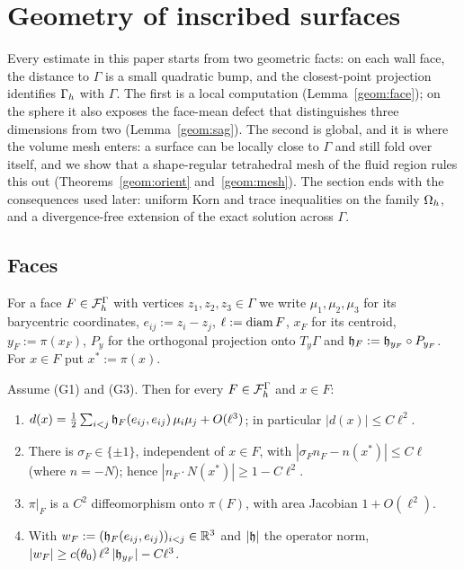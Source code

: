 \section{Geometry of inscribed surfaces}\label{sec:geometry}

Every estimate in this paper starts from two geometric facts: on each wall face, the distance to $\Gamma$ is a small quadratic bump, and the closest-point projection identifies $\Gamma_h$ with $\Gamma$. The first is a local computation (Lemma~\ref{geom:face}); on the sphere it also exposes the face-mean defect that distinguishes three dimensions from two (Lemma~\ref{geom:sag}). The second is global, and it is where the volume mesh enters: a surface can be locally close to $\Gamma$ and still fold over itself, and we show that a shape-regular tetrahedral mesh of the fluid region rules this out (Theorems~\ref{geom:orient} and~\ref{geom:mesh}). The section ends with the consequences used later: uniform Korn and trace inequalities on the family $\Omega_h$, and a divergence-free extension of the exact solution across $\Gamma$.

\subsection{Faces}
For a face $F\in\mathcal F_h^\Gamma$ with vertices $z_1,z_2,z_3\in\Gamma$ we write $\mu_1,\mu_2,\mu_3$ for its barycentric coordinates, $e_{ij}:=z_i-z_j$, $\ell:=\operatorname{diam} F$, $x_F$ for its centroid, $y_F:=\pi(x_F)$, $P_y$ for the orthogonal projection onto $T_y\Gamma$ and $\mathfrak h_F:=\mathfrak h_{y_F}\circ P_{y_F}$. For $x\in F$ put $x^\ast:=\pi(x)$.

\begin{lemma}\label{geom:face}
Assume (G1) and (G3). Then for every $F\in\mathcal F_h^\Gamma$ and $x\in F$:
\begin{enumerate}[label=(\alph*)]
\item $d(x)=\frac12\sum_{i<j}\mathfrak h_F(e_{ij},e_{ij})\,\mu_i\mu_j+O(\ell^3)$; in particular $|d(x)|\le C\ell^2$.
\item There is $\sigma_F\in\{\pm1\}$, independent of $x\in F$, with $|\sigma_Fn_F-n(x^\ast)|\le C\ell$ (where $n=-N$); hence $|n_F\cdot N(x^\ast)|\ge1-C\ell^2$.
\item $\pi|_F$ is a $C^2$ diffeomorphism onto $\pi(F)$, with area Jacobian $1+O(\ell^2)$.
\item With $w_F:=(\mathfrak h_F(e_{ij},e_{ij}))_{i<j}\in\mathbb R^3$ and $|\mathfrak h|$ the operator norm, $|w_F|\ge c(\theta_0)\,\ell^2\,|\mathfrak h_{y_F}|-C\ell^3$.
\end{enumerate}
\end{lemma}

